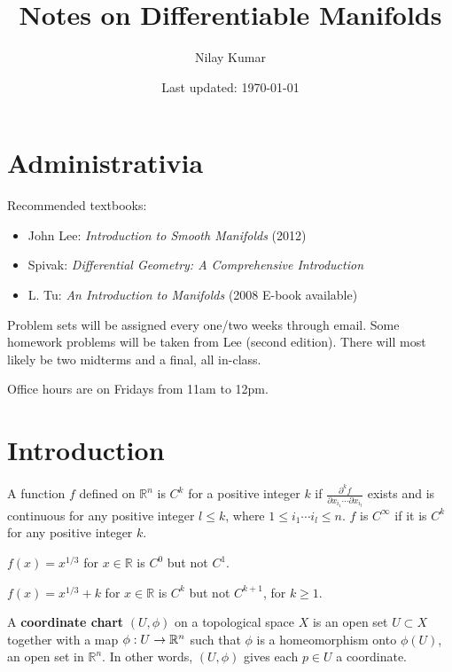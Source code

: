 \documentclass{mathnotes}
\title{Notes on Differentiable Manifolds}
\author{Nilay Kumar}
\date{Last updated: \today}
\begin{document}
\maketitle

\setcounter{section}{-1}

\section{Administrativia}

Recommended textbooks:
\begin{itemize}
    \item John Lee: \textit{Introduction to Smooth Manifolds} (2012)
    \item Spivak: \textit{Differential Geometry: A Comprehensive Introduction}
    \item L. Tu: \textit{An Introduction to Manifolds} (2008 E-book available)
\end{itemize}

Problem sets will be assigned every one/two weeks through email. Some homework problems will be taken from Lee (second edition).
There will most likely be two midterms and a final, all in-class.

Office hours are on Fridays from 11am to 12pm.

\section{Introduction}

\begin{defn}
    A function $f$ defined on $\mathbb{R}^n$ is $C^k$ for a positive integer $k$ if $\frac{\partial^k f}{\partial x_{i_1}\cdots\partial x_{i_l}}$ 
    exists and is continuous for any positive integer $l\leq k$, where $1\leq i_1\cdots i_l\leq n$. $f$ is $C^\infty$ if it is $C^k$ for any positive
    integer $k$.
\end{defn}

\begin{exmp}
    $f(x)=x^{1/3}$ for $x\in\mathbb{R}$ is $C^0$ but not $C^1$.
\end{exmp}

\begin{exmp}
    $f(x)=x^{1/3}+k$ for $x\in\mathbb{R}$ is $C^k$ but not $C^{k+1}$, for $k\geq 1$.
\end{exmp}

\begin{defn}
    A \textbf{coordinate chart} $(U,\phi)$ on a topological space $X$ is an open set $U\subset X$ together with a map $\phi:U\rightarrow \mathbb{R}^n$
    such that $\phi$ is a homeomorphism onto $\phi(U)$, an open set in $\mathbb{R}^n$. In other words, $(U,\phi)$ gives each $p\in U$ a
    coordinate.
\end{defn}
\end{document}
